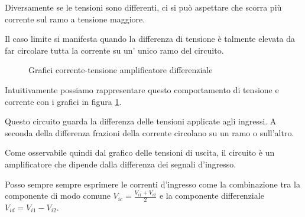 \documentclass[../template]{subfiles}
\begin{document}
Diversamente se le tensioni sono differenti, ci si può aspettare che scorra più corrente sul ramo a tensione maggiore.

Il caso limite si manifesta quando la differenza di tensione è talmente elevata da far circolare tutta la corrente
su un' unico ramo del circuito.


\begin{figure}[h]

    \caption{Grafici corrente-tensione amplificatore differenziale}
    \label{fig:tensione_corrente_opamp}
\end{figure}

Intuitivamente possiamo rappresentare questo comportamento di tensione e corrente con i grafici in figura \ref{fig:tensione_corrente_opamp}.

Questo circuito guarda la differenza delle tensioni applicate agli ingressi.
A seconda della differenza frazioni della corrente circolano su un ramo o sull'altro.

Come osservabile quindi dal grafico delle tensioni di uscita, il circuito è un amplificatore che dipende dalla
differenza dei segnali d'ingresso.

Posso sempre sempre esprimere le correnti d'ingresso come la combinazione tra la componente di modo comune
$V_{ic} = \frac{V_{i1} + V_{i2}}{2}$ e la componente differenziale $V_{id} = V_{i1} - V_{i2}$.
\end{document}
